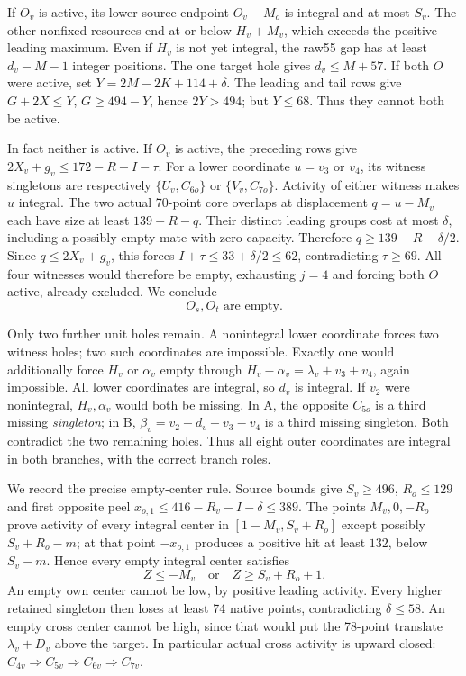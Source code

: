 \documentclass[11pt,letterpaper]{article}
\theoremstyle{definition}\newtheorem{definition}[theorem]{Definition}
\begin{document}
If $O_v$ is active, its lower source endpoint $O_v-M_o$ is integral and
at most $S_v$. The other nonfixed resources end at or below $H_v+M_v$,
which exceeds the positive leading maximum. Even if $H_v$ is not yet
integral, the raw55 gap has at least $d_v-M-1$ integer positions.
The one target hole gives $d_v\le M+57$.
If both $O$ were active, set $Y=2M-2K+114+\delta$. The leading and tail
rows give $G+2X\le Y$, $G\ge494-Y$, hence $2Y>494$; but $Y\le68$.
Thus they cannot both be active.

In fact neither is active. If $O_v$ is active, the preceding rows give
$2X_v+g_v\le172-R-I-\tau$.
For a lower coordinate $u=v_3$ or $v_4$, its witness singletons are
respectively $\{U_v,C_{6o}\}$ or $\{V_v,C_{7o}\}$.
Activity of either witness makes $u$ integral. The two actual 70-point
core overlaps at displacement $q=u-M_v$ each have size at least
$139-R-q$. Their distinct leading groups cost at most $\delta$,
including a possibly empty mate with zero capacity. Therefore
$q\ge139-R-\delta/2$. Since $q\le2X_v+g_v$, this forces
$I+\tau\le33+\delta/2\le62$, contradicting $\tau\ge69$.
All four witnesses would therefore be empty, exhausting $j=4$ and
forcing both $O$ active, already excluded. We conclude
\begin{equation}
 O_s,O_t\text{ are empty}.                         \label{eq:p4-O}
\end{equation}

Only two further unit holes remain. A nonintegral lower coordinate
forces two witness holes; two such coordinates are impossible. Exactly
one would additionally force $H_v$ or $\alpha_v$ empty through
$H_v-\alpha_v=\lambda_v+v_3+v_4$, again impossible.
All lower coordinates are integral, so $d_v$ is integral.
If $v_2$ were nonintegral, $H_v,\alpha_v$ would both be missing.
In A, the opposite $C_{5o}$ is a third missing \emph{singleton}; in B,
$\beta_v=v_2-d_v-v_3-v_4$ is a third missing singleton.
Both contradict the two remaining holes. Thus all eight outer
coordinates are integral in both branches, with the correct branch roles.

We record the precise empty-center rule. Source bounds give
$S_v\ge496$, $R_o\le129$ and first opposite peel
$x_{o,1}\le416-R_v-I-\delta\le389$.
The points $M_v,0,-R_o$ prove activity of every integral center in
$[1-M_v,S_v+R_o]$ except possibly $S_v+R_o-m$; at that point $-x_{o,1}$
produces a positive hit at least $132$, below $S_v-m$.
Hence every empty integral center satisfies
\begin{equation}
 Z\le-M_v\quad\text{or}\quad Z\ge S_v+R_o+1.       \label{eq:p4-empty}
\end{equation}
An empty own center cannot be low, by positive leading activity.
Every higher retained singleton then loses at least 74 native points,
contradicting $\delta\le58$. An empty cross center cannot be high,
since that would put the 78-point translate $\lambda_v+D_v$ above the
target. In particular actual cross activity is upward closed:
$C_{4v}\Rightarrow C_{5v}\Rightarrow C_{6v}\Rightarrow C_{7v}$.
\end{document}
